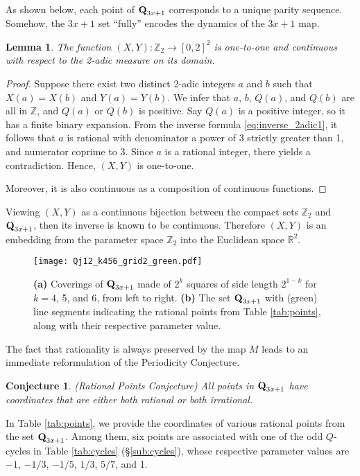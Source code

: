 \documentclass[12pt]{article}
\newtheorem{lemma}{Lemma}
\newtheorem{conjecture}{Conjecture}
\theoremstyle{definition}
\newcommand{\Qset}{\normalfont \textbf{Q}_{3x+1}}
\begin{document}
{As shown below, each point of $\Qset$ corresponds to a unique parity sequence. Somehow, the $3x+1$ set ``fully'' encodes the dynamics of the $3x+1$ map.
 
\begin{lemma} \label{lem:XY_oneone}
The function $(X,Y): \mathbb Z_2  \rightarrow [0, 2]^2$   is one-to-one and continuous with respect to the 2-adic measure on its domain.
\end{lemma}

\begin{proof}
Suppose there exist two distinct 2-adic integers $a$ and $b$ such that $X(a)=X(b)$ and $Y(a) = Y(b)$. We infer that $a$, $b$, $Q(a)$, and $Q(b)$ are all in $\mathbb Z$, and $Q(a)$ or $Q(b)$ is positive. Say $Q(a)$ is a positive integer, so it has a finite binary expansion. From the inverse formula \eqref{eq:inverse_2adic1}, it follows that $a$ is rational with denominator a power of 3 strictly greater than 1, and numerator coprime to 3. Since $a$ is a rational integer, there yields a contradiction. Hence, $(X,Y)$ is one-to-one.
 
Moreover, it is also continuous as a composition of continuous functions.
\end{proof}

Viewing $(X,Y)$ as a continuous bijection between the compact sets $\mathbb Z_2$ and $\Qset$, then its inverse is known to be continuous. Therefore $(X,Y)$ is an embedding from the parameter space $\mathbb Z_2$ into the Euclidean space $\mathbb R^2$. 

\begin{figure}
\centering
\texttt{[image: Qj12\_k456\_grid2\_green.pdf]}
\caption{\textbf{(a)} Coverings of $\Qset$ made of $2^k$ squares of side length $2^{1-k}$ for $k=4$, 5, and 6, from left to right. \textbf{(b)} The set $\Qset$ with (green) line segments indicating the rational points from Table \ref{tab:points}, along with their respective parameter value.}
\label{fig:QR}
\end{figure}

The fact that rationality is always preserved by the map $M$ leads to an immediate reformulation of the Periodicity Conjecture. 

\begin{conjecture} {\em (Rational Points Conjecture)}
All points in $\Qset$ have coordinates that are either both rational or both irrational.
\end{conjecture}

In Table \ref{tab:points}, we provide the coordinates of various rational points from the set $\Qset$. Among them, six points  are associated with one of the odd $Q$-cycles in Table \ref{tab:cycles} (\S\ref{sub:cycles}), whose respective parameter values are $-1$, $-1/3$, $-1/5$, $1/3$, $5/7$, and 1.

}
\end{document}
